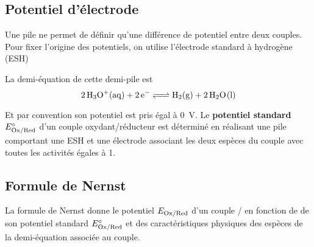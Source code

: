 \documentclass{cours}
\begin{document}
\subsection{Potentiel d'électrode}%
\label{sub:potentiel_d_electrode}

Une pile ne permet de définir qu'une différence de potentiel entre deux couples. Pour fixer l'origine des potentiels, on utilise l'électrode standard à hydrogène (ESH)  

\begin{center}
\end{center}

La demi-équation de cette demi-pile est 
\begin{equation}
  \ce{2H3O+(aq) + 2e- <=> H2(g) + 2H2O(l)}
\end{equation}

Et par convention son potentiel est pris égal à \SI{0}{\volt}. Le \textbf{potentiel standard} $E^\circ_{\ce{Ox/Red}}$  d'un couple oxydant/réducteur est déterminé en réalisant une pile comportant une ESH et une électrode associant les deux espèces du couple avec toutes les activités égales à 1.

\subsection{Formule de Nernst}%
\label{sub:formule_de_nernst}

La formule de Nernst donne le potentiel $E_{\ce{Ox}/\ce{Red}}$ d'un couple / en fonction de de son potentiel standard $E^\circ_{\ce{Ox/Red}}$ et des caractéristiques physiques des espèces de la demi-équation associée au couple.
\end{document}

